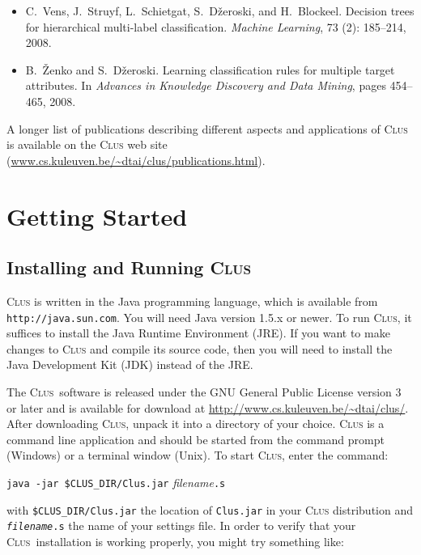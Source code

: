 \documentclass[a4paper]{report}
\newcommand{\clus}{\textsc{Clus}}
\begin{document}
\begin{itemize}
\item C.~Vens, J.~Struyf, L.~Schietgat, S.~D{\v z}eroski, and H.~Blockeel.
\newblock Decision trees for hierarchical multi-label classification.
\newblock \emph{Machine Learning}, 73 (2): 185--214, 2008.

\item B.~{\v{Z}}enko and S.~D{\v{z}}eroski.
\newblock Learning classification rules for multiple target attributes.
\newblock In \emph{Advances in Knowledge Discovery and Data Mining}, pages
  454--465, 2008.

\end{itemize}

A longer list of publications describing different aspects and applications of \clus{} is available on the \clus{} web site
(\url{www.cs.kuleuven.be/~dtai/clus/publications.html}).

\chapter{Getting Started}

\section{Installing and Running \clus}
\label{sec:run}

\begin{sloppypar}
\clus{} is written in the Java programming language, which is available from {\tt http://java.sun.com}. You will need Java version 1.5.x or newer. To run \clus{}, it suffices to install the Java Runtime Environment (JRE). If you want to make changes to \clus{} and compile its source code, then you will need to install the Java Development Kit (JDK) instead of the JRE.
\end{sloppypar}

The \clus\ software is released under the GNU General Public License version 3 or later and is available for download at \url{http://www.cs.kuleuven.be/~dtai/clus/}. After downloading \clus{}, unpack it into a directory of your choice. \clus{} is a command line application and should be started from the command prompt (Windows) or a terminal window (Unix). To start \clus{}, enter the command:
\begin{flushleft}
\verb^java -jar $CLUS_DIR/Clus.jar^ {\em filename}\verb^.s^
\end{flushleft}

\noindent{}with \verb^$CLUS_DIR/Clus.jar^ the location of \verb^Clus.jar^ in your \clus{} distribution and {\tt {\em filename}.s} the name of your settings file. In order to verify that your \clus\ installation is working properly, you might try something like:
\end{document}
